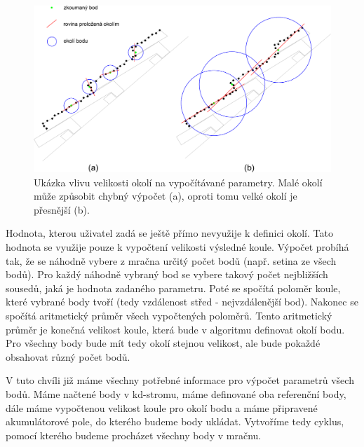 \documentclass[11pt,twoside,a4paper]{book}
\begin{document}
\begin{figure}[ht]
\begin{center}
\includegraphics[width=\textwidth]{figures/strecha-all}
\caption{Ukázka vlivu velikosti okolí na vypočítávané parametry. Malé okolí může způsobit chybný výpočet (a), oproti tomu velké okolí je přesnější (b).}
\label{fig:strecha}
\end{center}
\end{figure}

Hodnota, kterou uživatel zadá se ještě přímo nevyužije k definici okolí. Tato hodnota se využije pouze k vypočtení velikosti výsledné koule. Výpočet probíhá tak, že se náhodně vybere z mračna určitý počet bodů (např. setina ze všech bodů). Pro každý náhodně vybraný bod se vybere takový počet nejbližších sousedů, jaká je hodnota zadaného parametru. Poté se spočítá poloměr koule, které vybrané body tvoří (tedy vzdálenost střed - nejvzdálenější bod). Nakonec se spočítá aritmetický průměr všech vypočtených poloměrů. Tento aritmetický průměr je konečná velikost koule, která bude v algoritmu definovat okolí bodu. Pro všechny body bude mít tedy okolí stejnou velikost, ale bude pokaždé obsahovat různý počet bodů.

V tuto chvíli již máme všechny potřebné informace pro výpočet parametrů všech bodů. Máme načtené body v kd-stromu, máme definované oba referenční body, dále máme vypočtenou velikost koule pro okolí bodu a máme připravené akumulátorové pole, do kterého budeme body ukládat. Vytvoříme tedy cyklus, pomocí kterého budeme procházet všechny body v mračnu.
\end{document}
